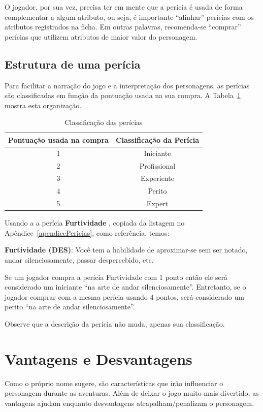 O jogador, por sua vez, precisa ter em mente que a perícia é usada de forma complementar a algum atributo, ou seja, é importante ``alinhar'' perícias com os atributos registrados na ficha. Em outras palavras, recomenda-se ``comprar'' perícias que utilizem atributos de maior valor do personagem.

\subsection*{Estrutura de uma perícia}
Para facilitar a narração do jogo e a interpretação dos personagens, as perícias são classificadas em função da pontuação usada na sua compra. A Tabela~\ref{tbl:classificPericias} mostra esta organização.

\begin{table}[htb]
	\centering
	\caption{Classificação das perícias}
	\begin{tabular}{|c|c|}
		\hline
		Pontuação usada na compra 	&	Classificação da Perícia\\
		\hline
		1		&	Iniciante \\
		\hline
		2		&	Profissional \\
		\hline
		3		&	Experiente \\
		\hline
		4		&	Perito \\
		\hline
		5		&	Expert \\
		\hline
	\end{tabular}
	\label{tbl:classificPericias}
\end{table}

Usando a a perícia \textbf{Furtividade }, copiada da listagem no Apêndice~\ref{apendicePericias}, como referência, temos:

\textbf{Furtividade (DES)}: Você tem a habilidade de aproximar-se sem ser notado, andar silenciosamente, passar despercebido, etc.

Se um jogador compra a perícia Furtividade com 1 ponto então ele será considerado um iniciante ``na arte de andar silenciosamente''. Entretanto, se o jogador comprar com a mesma perícia usando 4 pontos, será considerado um perito ``na arte de andar silenciosamente''. 

Observe que a descrição da perícia não muda, apenas sua classificação.

\section{\label{subsecVantagens}Vantagens e Desvantagens}
Como o próprio nome sugere, são características que irão influenciar o personagem durante as aventuras. Além de deixar o jogo muito mais divertido, as vantagens ajudam enquanto desvantagens atrapalham/penalizam o personagem. 

